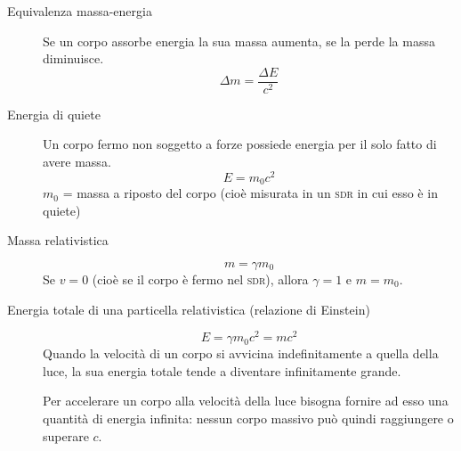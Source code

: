 \documentclass[a4paper,11pt,italian]{article}
\begin{document}
\begin{description}
%   
%   
%   
%   
  
  \item[Equivalenza massa-energia] Se un corpo assorbe energia la sua massa aumenta, se la perde la massa diminuisce.
  \[ \Delta m = \frac{\Delta E}{c^2} \]
  
  \item[Energia di quiete] Un corpo fermo non soggetto a forze possiede energia per il solo fatto di avere massa.
  \[ E = m_0 c^2 \]
  $ m_0 $ = massa a riposto del corpo (cioè misurata in un \textsc{sdr} in cui esso è in quiete)
  
  \item[Massa relativistica]
  \[ m = \gamma m_0 \]
  Se $ v = 0 $ (cioè se il corpo è fermo nel \textsc{sdr}), allora $ \gamma = 1 $ e $ m=m_0 $.
  
  \item[Energia totale di una particella relativistica (relazione di Einstein)]
  \[ E = \gamma m_0 c^2 = mc^2\]
  Quando la velocità di un corpo si avvicina indefinitamente a quella della luce, la sua energia totale tende a diventare infinitamente grande.
  
  Per accelerare un corpo alla velocità della luce bisogna fornire ad esso una quantità di energia infinita: nessun corpo massivo può quindi raggiungere o superare $ c $.
  

\end{description}
\end{document}
